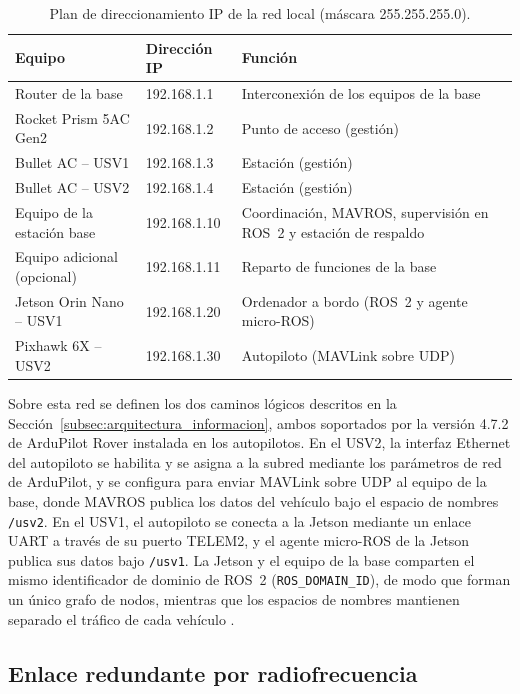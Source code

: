 \begin{table}[!htb]
\centering
\caption{Plan de direccionamiento IP de la red local (máscara 255.255.255.0).}
\label{tab:plan_ip}
\small
\begin{tabular}{|p{4.6cm}|p{3cm}|p{5.2cm}|}
\hline
\textbf{Equipo} & \textbf{Dirección IP} & \textbf{Función} \\ \hline
Router de la base & 192.168.1.1 & Interconexión de los equipos de la base \\ \hline
Rocket Prism 5AC Gen2 & 192.168.1.2 & Punto de acceso (gestión) \\ \hline
Bullet AC -- USV1 & 192.168.1.3 & Estación (gestión) \\ \hline
Bullet AC -- USV2 & 192.168.1.4 & Estación (gestión) \\ \hline
Equipo de la estación base & 192.168.1.10 & Coordinación, MAVROS, supervisión en ROS~2 y estación de respaldo \\ \hline
Equipo adicional (opcional) & 192.168.1.11 & Reparto de funciones de la base \\ \hline
Jetson Orin Nano -- USV1 & 192.168.1.20 & Ordenador a bordo (ROS~2 y agente micro-ROS) \\ \hline
Pixhawk 6X -- USV2 & 192.168.1.30 & Autopiloto (MAVLink sobre UDP) \\ \hline
\end{tabular}
\end{table}
 
Sobre esta red se definen los dos caminos lógicos descritos en la Sección~\ref{subsec:arquitectura_informacion}, 
ambos soportados por la versión 4.7.2 de ArduPilot Rover instalada en los autopilotos. En el USV2, la interfaz 
Ethernet del autopiloto se habilita y se asigna a la subred mediante los parámetros de red de ArduPilot, y se 
configura para enviar MAVLink sobre UDP al equipo de la base, donde MAVROS publica los datos del vehículo bajo el 
espacio de nombres \texttt{/usv2}. En el USV1, el autopiloto se conecta a la Jetson mediante un enlace UART a 
través de su puerto TELEM2, y el agente micro-ROS de la Jetson publica sus datos bajo \texttt{/usv1}. La Jetson y 
el equipo de la base comparten el mismo identificador de dominio de ROS~2 (\texttt{ROS\_DOMAIN\_ID}), de modo que 
forman un único grafo de nodos, mientras que los espacios de nombres mantienen separado el tráfico de cada 
vehículo \cite{albatati2026}.
 
\subsection{Enlace redundante por radiofrecuencia}
\label{subsec:enlace_redundante}
 
